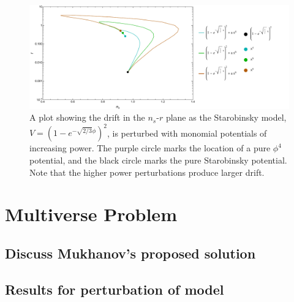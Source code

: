 \documentclass[a4paper,11pt]{article}
\def\nsr{$n_s$-$r$ }
\begin{document}
\begin{figure}[h!]
	\centering
	\includegraphics[width=\textwidth]{figures/LFP_lines_Rsq_varyaf_final.pdf}
	\caption[Drift in \nsr plane for Starobinsky model with increasing perturbing power.]{A plot showing the drift in the \nsr plane as the Starobinsky model, $V=(1-e^{-\sqrt{2/3}\phi})^2$, is perturbed with monomial potentials of increasing power. The purple circle marks the location of a pure $\phi^4$ potential, and the black circle marks the pure Starobinsky potential. Note that the higher power perturbations produce larger drift.}
	\label{fig:LFP_Rsq_varyaf_drift}
\end{figure}



\FloatBarrier
\newpage
\section{Multiverse Problem}
\subsection{Discuss Mukhanov's proposed solution}
\subsection{Results for perturbation of model}
\end{document}

